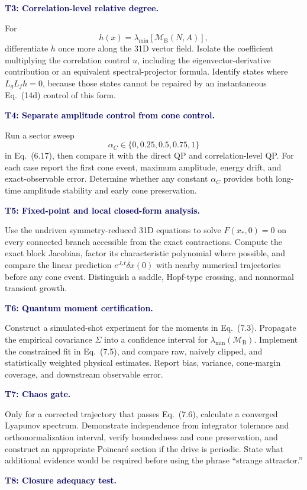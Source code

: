\documentclass[10pt]{article}
\newcommand{\MB}{\mathcal M_{\mathrm B}}
\newcommand{\flowlead}[1]{%
  \par\medskip
  \needspace{3\baselineskip}%
  \noindent\textcolor{navy}{\textbf{#1.}}\enspace\ignorespaces
}
\begin{document}
\flowlead{T3: Correlation-level relative degree}

For
\[
h(x)=\lambda_{\min}[\MB(N,A)],
\]
differentiate \(\dot h\) once more along the 31D vector field.  Isolate the
coefficient multiplying the correlation control \(u\), including the
eigenvector-derivative contribution or an equivalent spectral-projector
formula.  Identify states where \(L_gL_fh=0\), because those states cannot be
repaired by an instantaneous Eq.~(14d) control of this form.

\flowlead{T4: Separate amplitude control from cone control}

Run a sector sweep
\[
\alpha_C\in\{0,0.25,0.5,0.75,1\}
\]
in Eq.~(6.17), then compare it with the direct QP and correlation-level QP.
For each case report the first cone event, maximum amplitude, energy drift,
and exact-observable error.  Determine whether any constant \(\alpha_C\)
provides both long-time amplitude stability and early cone preservation.

\flowlead{T5: Fixed-point and local closed-form analysis}

Use the undriven symmetry-reduced 31D equations to solve
\(F(x_\ast,0)=0\) on every connected branch accessible from the exact
contractions.  Compute the exact block Jacobian, factor its characteristic
polynomial where possible, and compare the linear prediction
\(e^{J_\ast t}\delta x(0)\) with nearby numerical trajectories before any cone
event.  Distinguish a saddle, Hopf-type crossing, and nonnormal transient
growth.

\flowlead{T6: Quantum moment certification}

Construct a simulated-shot experiment for the moments in Eq.~(7.3).
Propagate the empirical covariance \(\Sigma\) into a confidence interval for
\(\lambda_{\min}(\MB)\).  Implement the constrained fit in Eq.~(7.5), and
compare raw, naively clipped, and statistically weighted physical estimates.
Report bias, variance, cone-margin coverage, and downstream observable error.

\flowlead{T7: Chaos gate}

Only for a corrected trajectory that passes Eq.~(7.6), calculate a converged
Lyapunov spectrum.  Demonstrate independence from integrator tolerance and
orthonormalization interval, verify boundedness and cone preservation, and
construct an appropriate Poincar\'e section if the drive is periodic.  State
what additional evidence would be required before using the phrase
``strange attractor.''

\flowlead{T8: Closure adequacy test}
\end{document}
